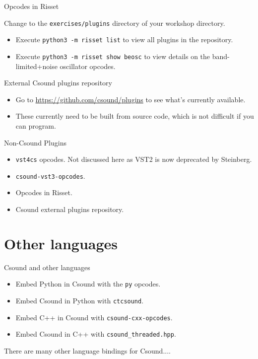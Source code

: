 \documentclass{beamer}
\begin{document}
\begin{frame}{Opcodes in Risset}
\begin{example}
Change to the \texttt{exercises/plugins} directory of your workshop directory.
\begin{itemize}
\item Execute \texttt{python3 -m risset list} to view all plugins in the repository.
\item Execute \texttt{python3 -m risset show beosc} to view details on the band-limited+noise  oscillator opcodes.
\end{itemize}
\end{example}
\end{frame}

\begin{frame}{External Csound plugins repository}
\begin{itemize}
\item Go to \url{https://github.com/csound/plugins} to see what's currently available.
\item These currently need to be built from source code, which is not difficult if you can program.
\end{itemize}
\end{frame}

\begin{frame}{Non-Csound Plugins}
\begin{itemize}
\item \texttt{vst4cs} opcodes. Not discussed here as VST2 is now deprecated by Steinberg.
\item \texttt{csound-vst3-opcodes}.
\item Opcodes in Risset.
\item Csound external plugins repository.
\end{itemize}
\end{frame}

\section{Other languages}
\begin{frame}{Csound and other languages}
\begin{itemize}
\item Embed Python in Csound with the \texttt{py} opcodes.
\item Embed Csound in Python with \texttt{ctcsound}.
\item Embed C++ in Csound with \texttt{csound-cxx-opcodes}.
\item Embed Csound in C++ with \texttt{csound\_threaded.hpp}.
\end{itemize}
There are many other language bindings for Csound....
\end{frame}
\end{document}
